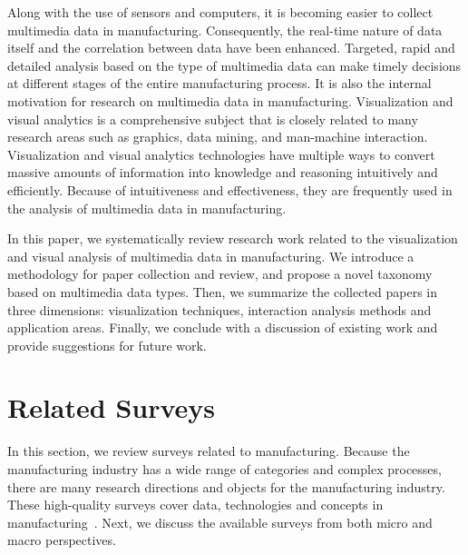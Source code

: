 \documentclass[a4paper,fleqn]{cas-dc}
\begin{document}
Along with the use of sensors and computers, it is becoming easier to collect multimedia data in manufacturing.
Consequently, the real-time nature of data itself and the correlation between data have been enhanced.
Targeted, rapid and detailed analysis based on the type of multimedia data can make timely decisions at different stages of the entire manufacturing process.
It is also the internal motivation for research on multimedia data in manufacturing.
Visualization and visual analytics is a comprehensive subject that is closely related to many research areas such as graphics, data mining, and man-machine interaction.
Visualization and visual analytics technologies have multiple ways to convert massive amounts of information into knowledge and reasoning intuitively and efficiently. Because of intuitiveness and effectiveness, they are frequently used in the analysis of multimedia data in manufacturing.

In this paper, we systematically review research work related to the visualization and visual analysis of multimedia data in manufacturing.
We introduce a methodology for paper collection and review, and propose a novel taxonomy based on multimedia data types.
Then, we summarize the collected papers in three dimensions: visualization techniques, interaction analysis methods and application areas.
Finally, we conclude with a discussion of existing work and provide suggestions for future work.

\section{Related Surveys}
In this section, we review surveys related to manufacturing.
Because the manufacturing industry has a wide range of categories and complex processes, there are many research directions and objects for the manufacturing industry.
These high-quality surveys cover data, technologies and concepts in manufacturing~\cite{Baboli2021,Chhikara2022,Cui2020,Park2020,Qu2019}.
Next, we discuss the available surveys from both micro and macro perspectives.
\end{document}
